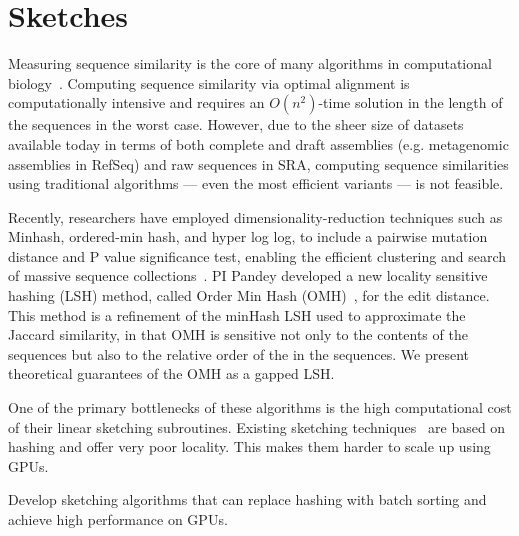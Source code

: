 \section{Sketches}

Measuring sequence similarity is the core of many algorithms in computational biology~\cite{Myers2000, Langmead2012,Li2010}. Computing sequence similarity via optimal alignment is computationally intensive and requires an $O(n^2)$-time solution in the length of the sequences in the worst case.  However, due to the sheer size of datasets available today in terms of both complete and draft assemblies (e.g. metagenomic assemblies in RefSeq) and raw sequences in SRA, computing sequence similarities using traditional algorithms --- even the most efficient variants --- is not feasible.

Recently, researchers have employed dimensionality-reduction techniques such as Minhash, ordered-min hash, and hyper log log, to include a pairwise mutation distance and P value significance test, enabling the efficient clustering and search of massive sequence collections~\cite{Mitzenmacher2014,ondov2016mash,Marais2019,Baker2019}. PI Pandey developed a new locality sensitive hashing (LSH) method, called Order Min Hash (OMH)~\cite{Marais2019}, for the edit distance. This method is a refinement of the minHash LSH used to approximate the Jaccard similarity, in that OMH is sensitive not only to the \kmer contents of the sequences but also to the relative order of the \kmers in the sequences. We present theoretical guarantees of the OMH as a gapped LSH\@.

One of the primary bottlenecks of these algorithms is the high computational cost of their linear sketching subroutines. Existing sketching techniques~\cite{ondov2016mash,Marais2019} are based on hashing and offer very poor locality. This makes them harder to scale up using GPUs.

\begin{rproblem}
Develop sketching algorithms that can replace hashing with batch sorting and achieve high performance on GPUs.
\end{rproblem}

